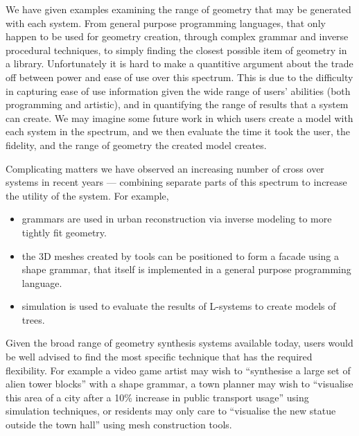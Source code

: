 We have given examples examining the range of geometry that may be generated with each system. From general purpose programming languages, that only happen to be used for geometry creation, through complex grammar and inverse procedural techniques, to simply finding the closest possible item of geometry in a library. Unfortunately it is hard to make a quantitive argument about the trade off between power and ease of use over this spectrum. This is due to the difficulty in capturing ease of use information given the wide range of users' abilities (both programming and artistic), and in quantifying the range of results that a system can create. We may imagine some future work in which users create a model with each system in the spectrum, and we then evaluate the time it took the user, the fidelity, and the range of geometry the created model creates.

Complicating matters we have observed an increasing number of cross over systems in recent years --- combining separate parts of this spectrum to increase the utility of the system. For example, 
\begin{itemize}
\item grammars are used in urban reconstruction via inverse modeling to more tightly fit geometry.  
\item the 3D meshes created by tools can be positioned to form a facade using a shape grammar, that itself is implemented in a general purpose programming language.
\item simulation is used to evaluate the results of L-systems to create models of trees. 
\end{itemize}

Given the broad range of geometry synthesis systems available today, users would be well advised to find the most specific technique that has the required flexibility. For example a video game artist may wish to ``synthesise a large set of alien tower blocks'' with a shape grammar, a town planner may wish to ``visualise this area of a city after a 10\% increase in public transport usage'' using simulation techniques, or residents may only care to ``visualise the new statue outside the town hall'' using mesh construction tools. 



